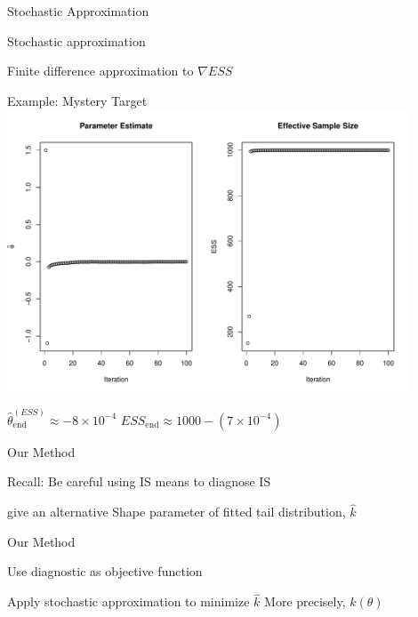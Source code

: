 \documentclass[14pt]{beamer}
\begin{document}
\begin{frame}{Stochastic Approximation}
    \begin{outline}
        \1 Stochastic approximation
            \2 \citep{Rob51} \newline

        \1 Finite difference approximation to  $\nabla ESS$
            \2 \citep{Kie52}
    \end{outline}
\end{frame}


\begin{frame}{Example: Mystery Target}
    \centering
    \includegraphics[height=0.7\textheight, width=0.9\textwidth, keepaspectratio]{Figures/ESS traj.pdf} \newline
    \begin{outline}
        $\hat{\theta}_\mathrm{end}^{(ESS)} \approx -8 \times 10^{-4}$ \hspace{1cm} $ESS_\mathrm{end} \approx 1000 - (7 \times 10^{-4})$
    \end{outline}
\end{frame}


\begin{frame}{Our Method}
    \begin{outline}
        \1 Recall: Be careful using IS means to diagnose IS \newline
        
        \1 \citeauthor{Veh22} give an alternative
            \2 Shape parameter of fitted tail distribution, $\hat{k}$
    \end{outline}
\end{frame}

\begin{frame}{Our Method}
    \begin{outline}
        \1 Use diagnostic as objective function \newline

        \1 Apply stochastic approximation to minimize $\hat{k}$
            \2 More precisely, $k(\theta)$
    \end{outline}
\end{frame}
\end{document}
